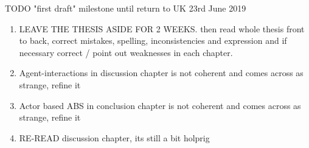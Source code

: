 \documentclass[oneside]{book}
\begin{document}

\bigskip

TODO "first draft" milestone until return to UK 23rd June 2019
\begin{enumerate}
	\item LEAVE THE THESIS ASIDE FOR 2 WEEKS. then read whole thesis front to back, correct mistakes, spelling, inconsistencies and expression and if necessary correct / point out weaknesses in each chapter.
	
	\item Agent-interactions in discussion chapter is not coherent and comes across as strange, refine it
	\item Actor based ABS in conclusion chapter is not coherent and comes across as strange, refine it
	\item RE-READ discussion chapter, its still a bit holprig
\end{enumerate}
\end{document}

